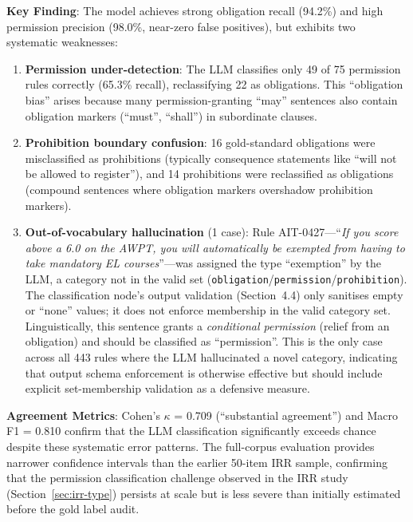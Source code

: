 \textbf{Key Finding}: The model achieves strong obligation recall (94.2\%) and high permission precision (98.0\%, near-zero false positives), but exhibits two systematic weaknesses:
\begin{enumerate}
    \item \textbf{Permission under-detection}: The LLM classifies only 49 of 75 permission rules correctly (65.3\% recall), reclassifying 22 as obligations. This ``obligation bias'' arises because many permission-granting ``may'' sentences also contain obligation markers (``must'', ``shall'') in subordinate clauses.
    
    \item \textbf{Prohibition boundary confusion}: 16 gold-standard obligations were misclassified as prohibitions (typically consequence statements like ``will not be allowed to register''), and 14 prohibitions were reclassified as obligations (compound sentences where obligation markers overshadow prohibition markers).
    
    \item \textbf{Out-of-vocabulary hallucination} (1 case): Rule AIT-0427---``\textit{If you score above a 6.0 on the AWPT, you will automatically be exempted from having to take mandatory EL courses}''---was assigned the type ``exemption'' by the LLM, a category not in the valid set (\texttt{obligation}/\texttt{permission}/\texttt{prohibition}). The classification node's output validation (Section~4.4) only sanitises empty or ``none'' values; it does not enforce membership in the valid category set. Linguistically, this sentence grants a \textit{conditional permission} (relief from an obligation) and should be classified as ``permission''. This is the only case across all 443 rules where the LLM hallucinated a novel category, indicating that output schema enforcement is otherwise effective but should include explicit set-membership validation as a defensive measure.
\end{enumerate}

\textbf{Agreement Metrics}: Cohen's $\kappa$ = 0.709 (``substantial agreement'') and Macro F1 = 0.810 confirm that the LLM classification significantly exceeds chance despite these systematic error patterns. The full-corpus evaluation provides narrower confidence intervals than the earlier 50-item IRR sample, confirming that the permission classification challenge observed in the IRR study (Section~\ref{sec:irr-type}) persists at scale but is less severe than initially estimated before the gold label audit.

